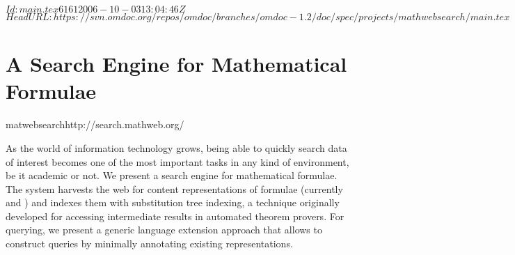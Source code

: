 \svnInfo $Id: main.tex 6161 2006-10-03 13:04:46Z  $
\svnKeyword $HeadURL: https://svn.omdoc.org/repos/omdoc/branches/omdoc-1.2/doc/spec/projects/mathwebsearch/main.tex $

\section{A Search Engine for Mathematical Formulae}
\begin{project}{matwebsearch}{http://search.mathweb.org/}
\end{project}

As the world of information technology grows, being able to quickly search data of
interest becomes one of the most important tasks in any kind of environment, be it
academic or not. We present a search engine for mathematical formulae. The {\mmlsearch}
system harvests the web for content representations of formulae (currently {\mathml} and
{\openmath}) and indexes them with substitution tree indexing, a technique originally
developed for accessing intermediate results in automated theorem provers. For querying,
we present a generic language extension approach that allows to construct queries by
minimally annotating existing representations.

